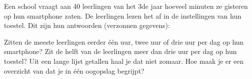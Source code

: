 %


\begin{probleem}
Een school vraagt aan 40 leerlingen van het 3de jaar hoeveel minuten ze gisteren op hun smartphone zaten. De leerlingen lezen het af in de instellingen van hun toestel. Dit zijn hun antwoorden (verzonnen gegevens):


Zitten de meeste leerlingen eerder één uur, twee uur of drie uur per dag op hun smartphone? Zit de helft van de leerlingen meer dan drie uur per dag op hun toestel? Uit een lange lijst getallen haal je dat niet zomaar. Hoe maak je er een overzicht van dat je in één oogopslag begrijpt?
\end{probleem}

